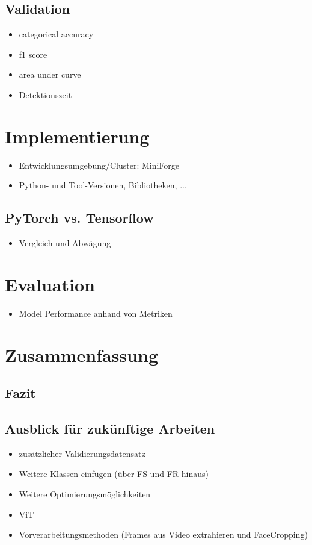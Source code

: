 \documentclass{article}
\begin{document}
    \subsection{Validation}
    \begin{itemize}
        \item categorical accuracy
        \item f1 score
        \item area under curve
        \item Detektionszeit
    \end{itemize}

    \newpage
    \section{Implementierung}
    \begin{itemize}
        \item Entwicklungsumgebung/Cluster: MiniForge
        \item Python- und Tool-Versionen, Bibliotheken, ... %
    \end{itemize}
    \subsection{PyTorch vs. Tensorflow}
    \begin{itemize}
        \item Vergleich und Abwägung
    \end{itemize}
    \section{Evaluation}
    \begin{itemize}
        \item Model Performance anhand von Metriken
    \end{itemize}

    \section{Zusammenfassung}
    \subsection{Fazit}
    \subsection{Ausblick für zukünftige Arbeiten}
    \begin{itemize}
        \item zusätzlicher Validierungsdatensatz %
        \item Weitere Klassen einfügen (über FS und FR hinaus)
        \item Weitere Optimierungsmöglichkeiten
        \item ViT
        \item Vorverarbeitungsmethoden (Frames aus Video extrahieren und FaceCropping)
    \end{itemize}
\end{document}
